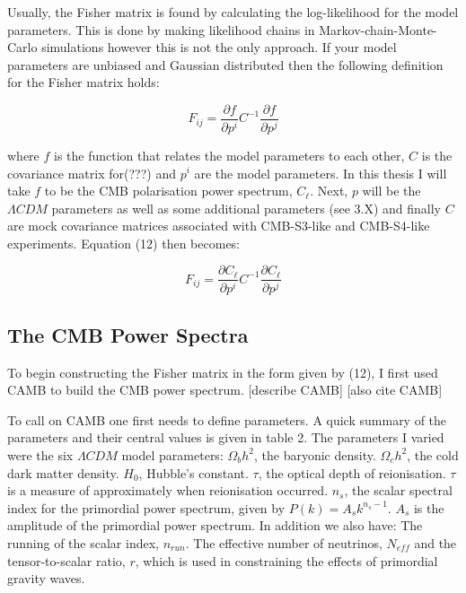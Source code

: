 Usually, the Fisher matrix is found by calculating the log-likelihood for the model parameters. This is done by making likelihood chains in Markov-chain-Monte-Carlo simulations however this is not the only approach. If your model parameters are unbiased and Gaussian distributed then the following definition for the Fisher matrix holds:

\begin{equation}
F_{ij} = \frac{\partial f}{\partial p^i} C^{-1} \frac{\partial f}{\partial p^j}
\end{equation}

where $f$ is the function that relates the model parameters to each other, $C$ is the covariance matrix for(???) and $p^{i}$ are the model parameters. In this thesis I will take $f$ to be the CMB polarisation power spectrum, $C_{\ell}$. Next, ${p}$ will be the $\Lambda CDM$ parameters as well as some additional parameters (see 3.X) and finally $C$ are mock covariance matrices associated with CMB-S3-like and CMB-S4-like experiments. Equation (12) then becomes:

\begin{equation}
F_{ij} = \frac{\partial C_{\ell}}{\partial p^i} C^{-1} \frac{\partial C_{\ell}}{\partial p^j}
\end{equation}

\subsection{The CMB Power Spectra}

To begin constructing the Fisher matrix in the form given by (12), I first used CAMB to build the CMB power spectrum. [describe CAMB] [also cite CAMB]

To call on CAMB one first needs to define parameters. A quick summary of the parameters and their central values is given in table 2. The parameters I varied were the six $\Lambda CDM$ model parameters: $\Omega_{b}h^{2}$, the baryonic density. $\Omega_{c}h^{2}$, the cold dark matter density. $H_0$, Hubble's constant. $\tau$, the optical depth of reionisation. $\tau$ is a measure of approximately when reionisation occurred. $n_s$, the scalar spectral index for the primordial power spectrum, given by $P(k) = A_s k^{n_s - 1}$. $A_s$ is the amplitude of the primordial power spectrum. In addition we also have: The running of the scalar index, $n_{run}$. The effective number of neutrinos, $N_{eff}$ and the tensor-to-scalar ratio, $r$, which is used in constraining the effects of primordial gravity waves.

